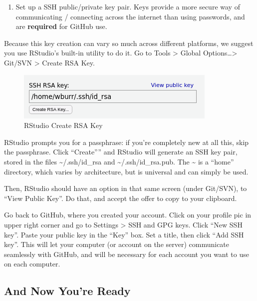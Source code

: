 \documentclass[
]{article}
\providecommand{\tightlist}{%
  \setlength{\itemsep}{0pt}\setlength{\parskip}{0pt}}
\begin{document}
\begin{enumerate}
\def\labelenumi{\arabic{enumi}.}
\setcounter{enumi}{4}
\tightlist
\item
  Set up a SSH public/private key pair. Keys provide a more secure way
  of communicating / connecting across the internet than using
  passwords, and are \textbf{required} for GitHub use.
\end{enumerate}

Because this key creation can vary so much across different platforms,
we suggest you use RStudio's built-in utility to do it. Go to Tools
\textgreater{} Global Options\ldots\textgreater{} Git/SVN \textgreater{}
Create RSA Key.

\begin{figure}
\centering
\includegraphics{img/create_RSA.png?raw=true}
\caption{RStudio Create RSA Key}
\end{figure}

RStudio prompts you for a passphrase: if you're completely new at all
this, skip the passphrase. Click ``Create'''' and RStudio will generate
an SSH key pair, stored in the files \textasciitilde/.ssh/id\_rsa and
\textasciitilde/.ssh/id\_rsa.pub. The \textasciitilde{} is a ``home''
directory, which varies by architecture, but is universal and can simply
be used.

Then, RStudio should have an option in that same screen (under Git/SVN),
to ``View Public Key''. Do that, and accept the offer to copy to your
clipboard.

Go back to GitHub, where you created your account. Click on your profile
pic in upper right corner and go to Settings \textgreater{} SSH and GPG
keys. Click ``New SSH key''. Paste your public key in the ``Key'' box.
Set a title, then click ``Add SSH key''. This will let your computer (or
account on the server) communicate seamlessly with GitHub, and will be
necessary for each account you want to use on each computer.

\hypertarget{and-now-youre-ready}{%
\subsection{And Now You're Ready}\label{and-now-youre-ready}}
\end{document}
